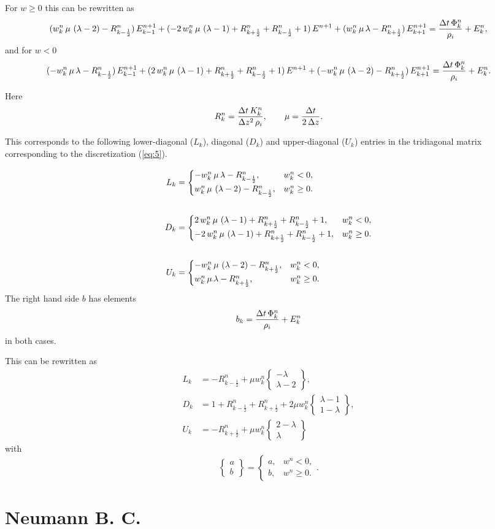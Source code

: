 \documentclass{article}
\newcommand{\wcase}[3]{\begin{cases} #1, & w^{n}_{#3} < 0,\\#2, & w^{n}_{#3} \ge 0.\end{cases}}
\newcommand{\wcaseeq}[4]{#1 &= \wcase{#2}{#3}{#4}}
\begin{document}
For $w \ge 0$ this can be rewritten as
\begin{equation}
  \label{eq:6}
  (w^{n}_{k}\,\mu\,\left(\lambda-2\right)-R^{n}_{k-\frac{1}{2}})\, E^{n+1}_{k-1} + (-2\,w^{n}_{k}\,\mu\,\left(\lambda-1\right)+R^{n}_{k+\frac{1}{2}}+R^{n}_{k-\frac{1}{2}}+1)\, E^{n+1} + (w^{n}_{k}\,\mu\,\lambda-R^{n}_{k+\frac{1}{2}})\, E^{n+1}_{k+1} = \frac{\Delta t\,\Phi^{n}_{k}}{\rho_{i}}+E^{n}_{k},
\end{equation}
and for $w < 0$
\begin{equation}
  \label{eq:7}
  (-w^{n}_{k}\,\mu\,\lambda-R^{n}_{k-\frac{1}{2}})\, E^{n+1}_{k-1} + (2\,w^{n}_{k}\,\mu\,\left(\lambda-1\right)+R^{n}_{k+\frac{1}{2}}+R^{n}_{k-\frac{1}{2}}+1)\, E^{n+1} + (-w^{n}_{k}\,\mu\,\left(\lambda-2\right)-R^{n}_{k+\frac{1}{2}})\, E^{n+1}_{k+1} = \frac{\Delta t\,\Phi^{n}_{k}}{\rho_{i}}+E^{n}_{k}.
\end{equation}

Here
\begin{equation}
  R^{n}_{k} = \frac{\Delta t\,K^{n}_{k}}{\Delta z^2\,\rho_{i}},\quad\quad \mu = \frac{\Delta t}{2\,\Delta z}.
\end{equation}

This corresponds to the following lower-diagonal ($L_{k}$), diagonal
($D_{k}$) and upper-diagonal ($U_{k}$) entries in the tridiagonal
matrix corresponding to the discretization (\ref{eq:5}).

\begin{align}
  \wcaseeq{L_{k}}{\Lm}{\Lp}{k}\\
  \notag\\
  \wcaseeq{D_{k}}{\Dm}{\Dp}{k}\\
  \notag\\
  \wcaseeq{U_{k}}{\Um}{\Up}{k}
\end{align}
The right hand side $b$ has elements
\begin{equation}
  \label{eq:8}
  b_{k} = \frac{\Delta t\,\Phi^{n}_{k}}{\rho_{i}}+E^{n}_{k}
\end{equation}
in both cases.

\newcommand{\Rm}{R^{n}_{k-\frac{1}{2}}}
\newcommand{\Rp}{R^{n}_{k+\frac{1}{2}}}
\newcommand{\W}{w^{n}_{k}}
\newcommand{\wstack}[2]{\left\{\begin{matrix}#1\\#2\end{matrix} \right\}}
This can be rewritten as
\begin{align}
  L_{k} &= -\Rm + \mu\W \wstack{-\lambda}{\lambda - 2},\\
  D_{k} &= 1 + \Rm + \Rp + 2\mu\W \wstack{\lambda - 1}{1 - \lambda},\\
  U_{k} &= -\Rp + \mu\W \wstack{2 - \lambda}{\lambda}
\end{align}
with
\begin{equation}
  \label{eq:12}
  \wstack{a}{b} = \wcase{a}{b}{}.
\end{equation}
\section{Neumann B. C.}
\label{sec:neumann-b-c}
\end{document}
